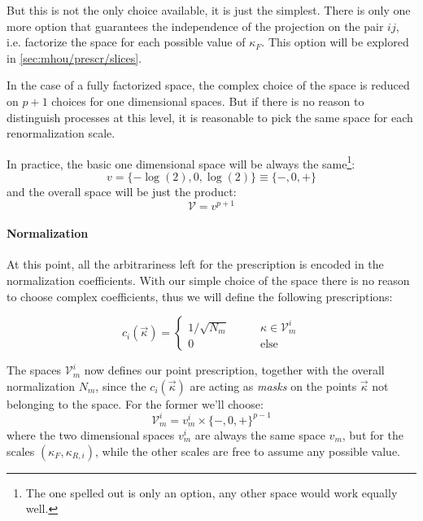 But this is not the only choice available, it is just the simplest.
There is only one more option that guarantees the independence of the
projection on the pair $ij$, i.e. factorize the space for each possible value
of $\kappa_F$.
This option will be explored in \cref{sec:mhou/prescr/slices}.
\newline

In the case of a fully factorized space, the complex choice of the space is
reduced on $p + 1$ choices for one dimensional spaces.
But if there is no reason to distinguish processes at this level, it is
reasonable to pick the same space for each renormalization scale.

In practice, the basic one dimensional space will be always the same\footnote{
    The one spelled out is only an option, any other space would work equally
    well.
}:
\begin{equation}
    \label{eq:1dim-space}
    v = \{-\log(2), 0, \log(2)\} \equiv \{-, 0, +\}
\end{equation}
and the overall space will be just the product:
\begin{equation}
    \mathcal{V} = v^{p + 1}
\end{equation}

\paragraph{Normalization} At this point, all the arbitrariness left for the
prescription is encoded in the normalization coefficients.
With our simple choice of the space there is no reason to choose complex
coefficients, thus we will define the following prescriptions:

\begin{equation}
\label{eq:norm_coeff}
    c_i(\vec{\kappa}) = 
    \begin{cases}
        1 / \sqrt{N_m}     \qquad &\kappa \in \mathcal{V}^i_m\\
        0                  \qquad &\text{else}
    \end{cases}
\end{equation}

The spaces $\mathcal{V}_m^i$ now defines our point prescription, together with
the overall normalization $N_m$, since the $c_{i}(\vec{\kappa})$ are acting as \textit{masks} on the points $\vec{\kappa}$ not belonging to the space.
For the former we'll choose:
\begin{equation}
    \mathcal{V}_m^i = v_m^i \times \{-, 0, +\}^{p-1}
\end{equation}
where the two dimensional spaces $v_m^i$ are always the same space $v_m$, but
for the scales $(\kappa_F, \kappa_{R,i})$, while the other scales are free to
assume any possible value.

